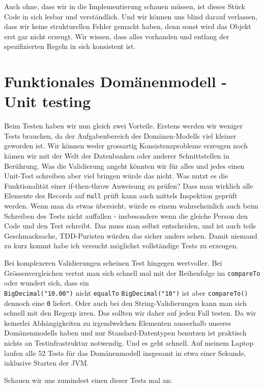 Auch ohne, dass wir in die Implementierung schauen müssen, ist dieses Stück
Code in sich lesbar und verständlich. Und wir können uns blind darauf verlassen,
dass wir keine strukturellen Fehler gemacht haben, denn sonst wird das Objekt 
erst gar nicht erzeugt. Wir wissen, dass alles vorhanden und entlang der 
spezifizierten Regeln in sich konsistent ist.

\section{Funktionales Domänenmodell - Unit testing}
Beim Testen haben wir nun gleich zwei Vorteile. Erstens werden wir weniger Tests
brauchen, da der Aufgabenbereich des Domänen-Modells viel kleiner geworden ist.
Wir können weder grossartig Konsistenzprobleme erzeugen noch kämen wir mit der
Welt der Datenbanken oder anderer Schnittstellen in Berührung. Was die 
Validierung angeht könnten wir für alles und jedes einen Unit-Test schreiben
aber viel bringen würde das nicht. Was nutzt es die Funktionalität einer
if-then-throw Anweisung zu prüfen? Dass man wirklich alle Elemente des Records
auf \texttt{null} prüft kann auch mittels Inspektion geprüft werden. Wenn man 
da etwas übersieht, würde es einem wahrscheinlich auch beim Schreiben des Tests
nicht auffallen - insbesondere wenn die gleiche Person den Code und den Test
schreibt. Das muss man selbst entscheiden, und ist auch teils Geschmacksache,
TDD-Puristen würden das sicher anders sehen. Damit niemand zu kurz kommt habe
ich versucht möglichst vollständige Tests zu erzeugen.

Bei komplexeren Validierungen scheinen Test hingegen wertvoller. Bei 
Grössenvergleichen vertut man sich schnell mal mit der Reihenfolge im
\texttt{compareTo} oder wundert sich, dass ein \\ \texttt{BigDecimal("10.00")} 
nicht \texttt{equalTo} \texttt{BigDecimal("10")} ist aber \texttt{compareTo()}
dennoch eine \texttt{0} liefert. 
Oder auch bei den String-Validierungen kann man sich schnell
mit den Regexp irren. Das sollten wir daher auf jeden Fall testen. 
Da wir keinerlei Abhängigkeiten zu irgendwelchen Elementen ausserhalb unseres 
Domänenmodells haben und nur Standard-Datentypen benutzen ist praktisch nichts
an Testinfrastruktur notwendig. Und es geht schnell. Auf meinem Laptop laufen
alle 52 Tests für das Domänenmodell insgesamt in etwa einer Sekunde, inklusive
Starten der JVM.

Schauen wir uns zumindest einen dieser Tests mal an:

